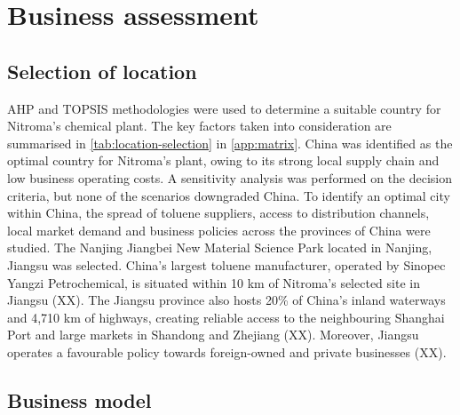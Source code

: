 \section{Business assessment}
\label{sec:economics}
\subsection{Selection of location} 
AHP and TOPSIS methodologies were used to determine a suitable country for Nitroma’s chemical plant. The key factors taken into consideration are summarised in \cref{tab:location-selection} in \cref{app:matrix}. China was identified as the optimal country for Nitroma's plant, owing to its strong local supply chain and low business operating costs. A sensitivity analysis was performed on the decision criteria, but none of the scenarios downgraded China. To identify an optimal city within China, the spread of toluene suppliers, access to distribution channels, local market demand and business policies across the provinces of China were studied. The Nanjing Jiangbei New Material Science Park located in Nanjing, Jiangsu was selected. China’s largest toluene manufacturer, operated by Sinopec Yangzi Petrochemical, is situated within 10 km of Nitroma’s selected site in Jiangsu (XX). The Jiangsu province also hosts 20\% of China’s inland waterways and 4,710 km of highways, creating reliable access to the neighbouring Shanghai Port and large markets in Shandong and Zhejiang (XX). Moreover, Jiangsu operates a favourable policy towards foreign-owned and private businesses (XX). 

\subsection{Business model} 
